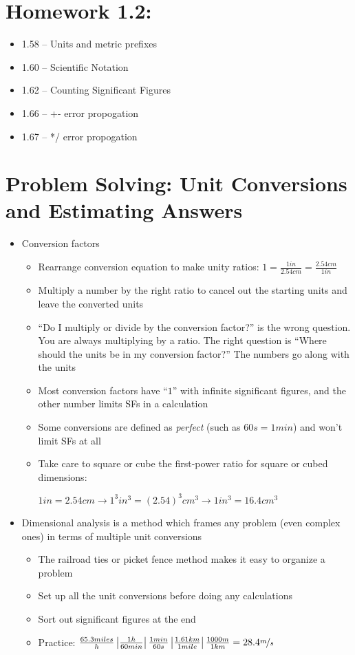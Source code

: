 \documentclass[12pt, openany, letterpaper]{memoir}
\begin{document}
\section*{Homework 1.2:}
	\begin{itemize}
		\item 1.58 -- Units and metric prefixes
		\item 1.60 -- Scientific Notation
		\item 1.62 -- Counting Significant Figures
		\item 1.66 -- +- error propogation
		\item 1.67 -- */ error propogation	
	\end{itemize}

\section{Problem Solving: Unit Conversions and Estimating Answers}
\begin{itemize}
	\item Conversion factors
	\begin{itemize}
		\item Rearrange conversion equation to make unity ratios: $1=\frac{1in}{2.54cm}=\frac{2.54cm}{1in}$
		\item Multiply a number by the right ratio to cancel out the starting units and leave the converted units
		\item ``Do I multiply or divide by the conversion factor?'' is the wrong question. You are always multiplying by a ratio. The right question is ``Where should the units be in my conversion factor?'' The numbers go along with the units
		\item Most conversion factors have ``$1$'' with infinite significant figures, and the other number limits SFs in a calculation
		\item Some conversions are defined as \emph{perfect} (such as $60s=1min$) and won't limit SFs at all
		\item Take care to square or cube the first-power ratio for square or cubed dimensions: 
		
		$1in=2.54cm\rightarrow1^3in^3=\left(2.54\right)^3cm^3\rightarrow 1in^3=16.4cm^3$
	\end{itemize}
	\item Dimensional analysis is a method which frames any problem (even complex ones) in terms of multiple unit conversions
	\begin{itemize}
		\item The railroad ties or picket fence method makes it easy to organize a problem
		\item Set up all the unit conversions before doing any calculations
		\item Sort out significant figures at the end
		\item Practice: $\frac{65.3miles}{h}\left|\frac{1h}{60min}\right|\frac{1min}{60s}\left|\frac{1.61km}{1mile}\right|\frac{1000m}{1km}=28.4\nicefrac{m}{s}$
	\end{itemize}
\end{itemize}
\end{document}
